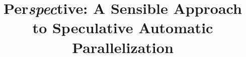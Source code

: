\documentclass[pageno]{jpaper}
\begin{document}
 \title{
 Per\textit{spec}tive: A Sensible Approach to Speculative Automatic
Parallelization}

 \date{}
 \maketitle

 \thispagestyle{empty}

 
 
 
 
 
 
 
 
 

 
 


 
\end{document}
